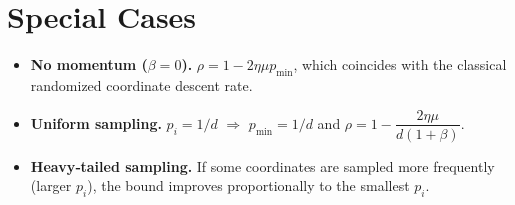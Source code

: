 \documentclass{article}
\begin{document}
\section*{Special Cases}
\begin{itemize}[nosep]
    \item \textbf{No momentum ($\beta=0$).}
          $\rho=1-2\eta\mu p_{\min}$, which coincides with the classical
          randomized coordinate descent rate.
    \item \textbf{Uniform sampling.}
          $p_i=1/d$ $\Rightarrow$ $p_{\min}=1/d$ and
          $\rho=1-\dfrac{2\eta\mu}{d(1+\beta)}$.
    \item \textbf{Heavy‑tailed sampling.}
          If some coordinates are sampled more frequently (larger $p_i$),
          the bound improves proportionally to the smallest $p_i$.
\end{itemize}
\end{document}
